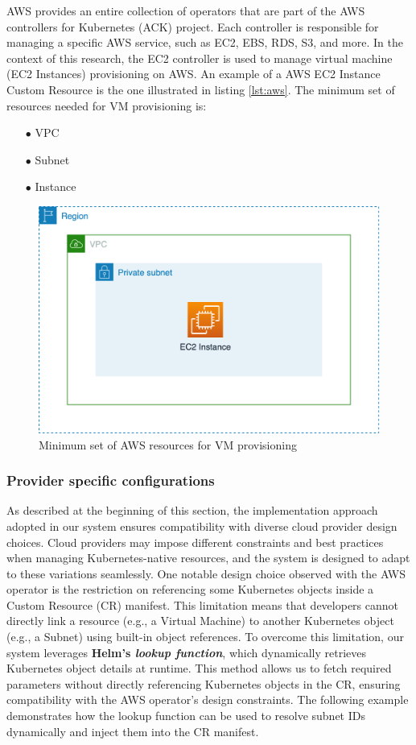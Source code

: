AWS provides an entire collection of operators that are part of the AWS controllers for Kubernetes (ACK) project.
Each controller is responsible for managing a specific AWS service, such as EC2, EBS, RDS, S3, and more. In the context of this research, the EC2 controller is used to manage virtual machine (EC2 Instances) provisioning on AWS.
An example of a AWS EC2 Instance Custom Resource is the one illustrated in listing \ref{lst:aws}.
The minimum set of resources needed for VM provisioning is:
\begin{itemize}[itemsep=0.2pt, topsep=1pt] 
\item[$\bullet$] VPC
\item[$\bullet$] Subnet
\item[$\bullet$] Instance
\end{itemize}

\begin{figure}[H]
\centering
\includegraphics[width=0.75\linewidth]{images/aws.png}
\caption{Minimum set of AWS resources for VM provisioning}
\label{fig:aws}
\end{figure}

\subsubsection{Provider specific configurations}

As described at the beginning of this section, the implementation approach adopted in our system ensures compatibility with diverse cloud provider design choices. Cloud providers may impose different constraints and best practices when managing Kubernetes-native resources, and the system is designed to adapt to these variations seamlessly.
One notable design choice observed with the AWS operator is the restriction on referencing some Kubernetes objects inside a Custom Resource (CR) manifest. This limitation means that developers cannot directly link a resource (e.g., a Virtual Machine) to another Kubernetes object (e.g., a Subnet) using built-in object references.
To overcome this limitation, our system leverages \textbf{Helm’s \textit{lookup function}}, which dynamically retrieves Kubernetes object details at runtime. This method allows us to fetch required parameters without directly referencing Kubernetes objects in the CR, ensuring compatibility with the AWS operator’s design constraints. The following example demonstrates how the lookup function can be used to resolve subnet IDs dynamically and inject them into the CR manifest. \newline

